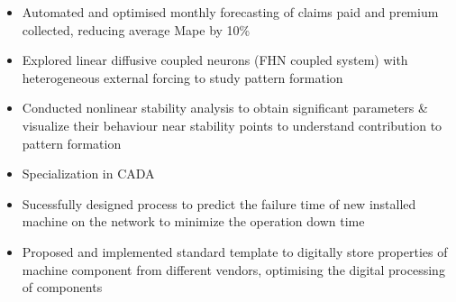 \documentclass[10pt,a4paper,ragged2e,withhyper]{altacv}
\begin{document}
\begin{paracol}{2}

\par\divider
{}
\begin{itemize}
\item Automated and optimised monthly forecasting of claims paid and premium collected, reducing average Mape by 10\%
\end{itemize}

\par\divider


\begin{itemize}
\item Explored linear diffusive coupled neurons (FHN coupled system) with heterogeneous external forcing to study pattern formation
\item Conducted nonlinear stability analysis to obtain significant parameters \& visualize their behaviour near stability points to understand contribution to pattern formation
\end{itemize}


\newpage

\switchcolumn

\label{sec:orga515844}

\divider

\divider


\label{sec:org3250eca}
\begin{itemize}
\item Specialization in CADA
\item Sucessfully designed process to predict the failure time of new installed machine on the network to minimize the operation down time
\item Proposed and implemented standard template to digitally store properties of machine component from different vendors, optimising the digital processing of components
\end{itemize}


\end{paracol}
\end{document}
